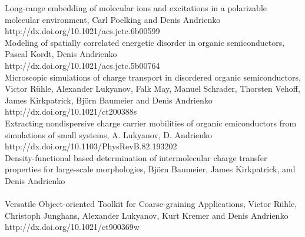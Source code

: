\vspace{0.1cm}
\noindent
\cite{poelking_long-range_2016} Long-range embedding of molecular ions and excitations in a polarizable molecular environment, Carl Poelking and Denis Andrienko \\
{http://dx.doi.org/10.1021/acs.jctc.6b00599} \\

\vspace{0.1cm}
\noindent
\cite{kordt_modeling_2016} Modeling of spatially correlated energetic disorder in organic semiconductors,
Pascal Kordt, Denis Andrienko \\
{http://dx.doi.org/10.1021/acs.jctc.5b00764} \\

\vspace{0.1cm}
\noindent
\cite{ruhle_microscopic_2011} Microscopic simulations of charge transport in disordered organic semiconductors, 
Victor R\"uhle, Alexander Lukyanov, Falk May, Manuel Schrader, Thorsten Vehoff, James Kirkpatrick, Bj\"orn Baumeier and Denis Andrienko \\
{http://dx.doi.org/10.1021/ct200388s} \\

\vspace{0.1cm}
\noindent
\cite{lukyanov_extracting_2010} Extracting nondispersive charge carrier mobilities of organic emiconductors from simulations of small systems, A. Lukyanov, D. Andrienko \\
{http://dx.doi.org/10.1103/PhysRevB.82.193202} \\

\vspace{0.1cm}
\noindent
\cite{baumeier_density-functional_2010}
      Density-functional based determination of intermolecular charge transfer properties for large-scale morphologies, Bj{\"o}rn Baumeier,  James Kirkpatrick, and Denis Andrienko \\
        \\

\vspace{0.1cm}
\noindent
\cite{ruhle_versatile_2009} Versatile Object-oriented Toolkit for Coarse-graining Applications, 
Victor R\"uhle, Christoph Junghans, Alexander Lukyanov, Kurt Kremer and Denis Andrienko \\
{http://dx.doi.org/10.1021/ct900369w}

